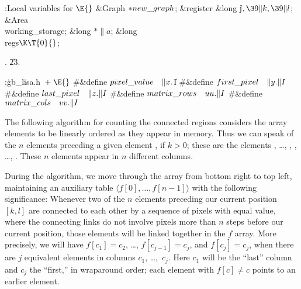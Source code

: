 \B{}:Local variables for \X${}\E{}$\6
\&{Graph} ${}{*}\\{new\_graph}{}$;\6
\&{register} \&{long} \|j${},\39\|k,\39\|l{}$;\6
\&{Area} \\{working\_storage};\6
\&{long} ${}{*}\|a{}$;\6
\&{long} \\{regs}${}\K\T{0}{}$;\par
{}.
\U23.\fi

\B{}:\.{gb\_lisa.h\,}\X${}\mathrel+\E{}$\6
\8\#\&{define} ${}\\{pixel\_value}\hbox{\quad}\|x.{}$\|I\6
\8\#\&{define} ${}\\{first\_pixel}\hbox{\quad}\|y.\|I{}$\6
\8\#\&{define} ${}\\{last\_pixel}\hbox{\quad}\|z.\|I{}$\6
\8\#\&{define} ${}\\{matrix\_rows}\hbox{\quad}\\{uu}.\|I{}$\6
\8\#\&{define} ${}\\{matrix\_cols}\hbox{\quad}\\{vv}.\|I{}$\par
\fi

The following algorithm for counting the connected regions considers
the array elements  to be linearly ordered as they appear
in memory. Thus we can speak of the $n$ elements preceding a given
element , if $k>0$; these are the elements , \dots,
, , \dots, . These $n$ elements appear
in $n$ different columns.

During the algorithm, we move through the array from bottom right
to top left, maintaining an auxiliary table $\langle f[0],\ldots,f[n-1]
\rangle$ with the following significance: Whenever two of the
$n$ elements preceding our current position $[k,l]$ are connected to
each other by a sequence of pixels with equal value, where the connecting
links do not involve pixels more than $n$ steps before our current
position, those elements will be linked together in the $f$ array.
More precisely, we will have $f[c_1]=c_2$, \dots, $f[c_{j-1}]=c_j$,
and $f[c_j]=c_j$, when there are $j$ equivalent elements in columns
$c_1$, \dots,~$c_j$. Here $c_1$ will be the ``last'' column and
$c_j$ the ``first,'' in wraparound order; each element with $f[c]\ne c$
points to an earlier element.

